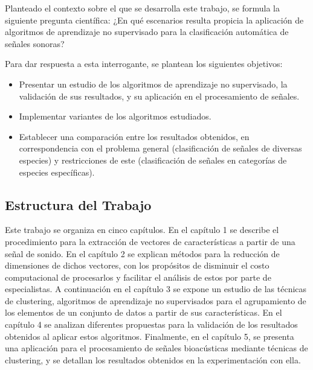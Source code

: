 Planteado el contexto sobre el que se desarrolla este trabajo, se formula la siguiente pregunta científica: ¿En qué escenarios resulta propicia la aplicación de algoritmos de aprendizaje no supervisado para la clasificación automática de señales sonoras?

Para dar respuesta a esta interrogante, se plantean los siguientes objetivos:
\begin{itemize}
    \item Presentar un estudio de los algoritmos de aprendizaje no supervisado, la validación de sus resultados, y su aplicación en el procesamiento de señales.
    \item Implementar variantes de los algoritmos estudiados.
    \item Establecer una comparación entre los resultados obtenidos, en correspondencia con el problema general (clasificación de señales de diversas especies) y restricciones de este (clasificación de señales en categorías de especies específicas).
\end{itemize}

\subsection*{Estructura del Trabajo}\label{subsec:estructuraDelTrabajo}

Este trabajo se organiza en cinco capítulos.
En el capítulo 1 se describe el procedimiento para la extracción de vectores de características a partir de una señal de sonido.
En el capítulo 2 se explican métodos para la reducción de dimensiones de dichos vectores, con los propósitos de disminuir el costo computacional de procesarlos y facilitar el análisis de estos por parte de especialistas.
A continuación en el capítulo 3 se expone un estudio de las técnicas de clustering, algoritmos de aprendizaje no supervisados para el agrupamiento de los elementos de un conjunto de datos a partir de sus características.
En el capítulo 4 se analizan diferentes propuestas para la validación de los resultados obtenidos al aplicar estos algoritmos.
Finalmente, en el capítulo 5, se presenta una aplicación para el procesamiento de señales bioacústicas mediante técnicas de clustering, y se detallan los resultados obtenidos en la experimentación con ella.
